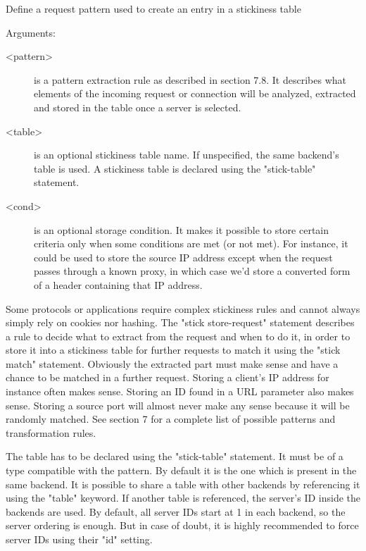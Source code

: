 
  Define a request pattern used to create an entry in a stickiness table


  Arguments:
  \begin{description}
  \item[<pattern>] is a pattern extraction rule as described in section 7.8. It
               describes what elements of the incoming request or connection
               will be analyzed, extracted and stored in the table once a
               server is selected.

  \item[<table>] is an optional stickiness table name. If unspecified, the same
               backend's table is used. A stickiness table is declared using
               the "stick-table" statement.

  \item[<cond>] is an optional storage condition. It makes it possible to store
               certain criteria only when some conditions are met (or not met).
               For instance, it could be used to store the source IP address
               except when the request passes through a known proxy, in which
               case we'd store a converted form of a header containing that IP
               address.
  \end{description}

  Some protocols or applications require complex stickiness rules and cannot
  always simply rely on cookies nor hashing. The "stick store-request" statement
  describes a rule to decide what to extract from the request and when to do
  it, in order to store it into a stickiness table for further requests to
  match it using the "stick match" statement. Obviously the extracted part must
  make sense and have a chance to be matched in a further request. Storing a
  client's IP address for instance often makes sense. Storing an ID found in a
  URL parameter also makes sense. Storing a source port will almost never make
  any sense because it will be randomly matched. See section 7 for a complete
  list of possible patterns and transformation rules.

  The table has to be declared using the "stick-table" statement. It must be of
  a type compatible with the pattern. By default it is the one which is present
  in the same backend. It is possible to share a table with other backends by
  referencing it using the "table" keyword. If another table is referenced,
  the server's ID inside the backends are used. By default, all server IDs
  start at 1 in each backend, so the server ordering is enough. But in case of
  doubt, it is highly recommended to force server IDs using their "id" setting.

